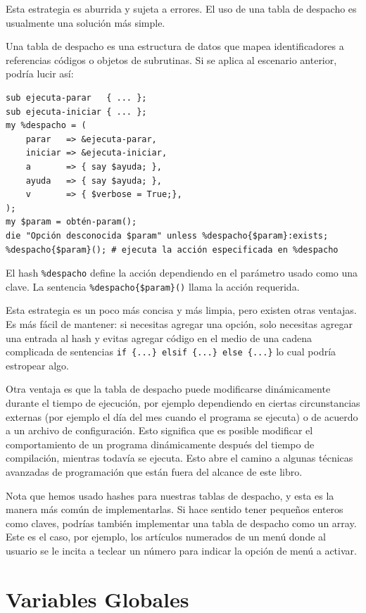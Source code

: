 Esta estrategia es aburrida y sujeta a errores. El uso de 
una tabla de despacho es usualmente una solución más simple.

Una tabla de despacho es una estructura de datos que mapea 
identificadores a referencias códigos o objetos de subrutinas.
Si se aplica al escenario anterior, podría lucir así:

\begin{verbatim}
sub ejecuta-parar   { ... };
sub ejecuta-iniciar { ... };
my %despacho = (
    parar   => &ejecuta-parar,
    iniciar => &ejecuta-iniciar,
    a       => { say $ayuda; },
    ayuda   => { say $ayuda; },
    v       => { $verbose = True;},
);
my $param = obtén-param();
die "Opción desconocida $param" unless %despacho{$param}:exists;
%despacho{$param}(); # ejecuta la acción especificada en %despacho
\end{verbatim}

El hash \verb|%despacho| define la acción dependiendo en el 
parámetro usado como una clave. La sentencia \verb|%despacho{$param}()|
llama la acción requerida.

Esta estrategia es un poco más concisa y más limpia, pero existen 
otras ventajas. Es más fácil de mantener: si necesitas agregar
una opción, solo necesitas agregar una entrada al hash y evitas
agregar código en el medio de una cadena complicada de sentencias
\verb'if {...} elsif {...} else {...}' lo cual podría estropear algo.

Otra ventaja es que la tabla de despacho puede modificarse
dinámicamente durante el tiempo de ejecución, por ejemplo 
dependiendo en ciertas circunstancias externas (por ejemplo el día
del mes cuando el programa se ejecuta) o de acuerdo a un 
archivo de configuración. Esto significa que es posible 
modificar el comportamiento de un programa dinámicamente 
después del tiempo de compilación, mientras todavía se
ejecuta. Esto abre el camino a algunas técnicas avanzadas de
programación que están fuera del alcance de este libro.

Nota que hemos usado hashes para nuestras tablas de despacho,
y esta es la manera más común de implementarlas. Si hace sentido
tener pequeños enteros como claves, podrías también implementar
una tabla de despacho como un array. Este es el caso, por ejemplo,
los artículos numerados de un menú donde al usuario se le incita
a teclear un número para indicar la opción de menú a activar.


\section{Variables Globales}

